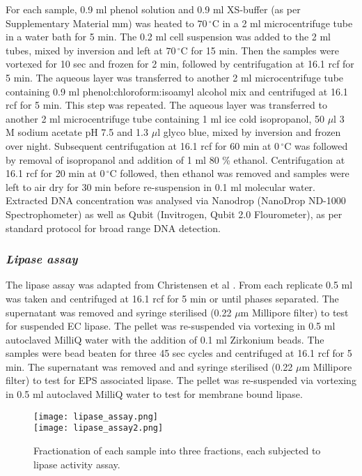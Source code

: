 \documentclass[11pt]{article}
\begin{document}
For each sample, 0.9 ml phenol solution and 0.9 ml XS-buffer (as per Supplementary Material mm) was  heated to $70\,^{\circ}\mathrm{C}$ in a 2 ml microcentrifuge tube in a water bath for 5 min. The 0.2 ml cell suspension was added to the 2 ml tubes, mixed by inversion and left at $70\,^{\circ}\mathrm{C}$ for 15 min. Then the samples were vortexed for 10 sec and frozen for 2 min, followed by centrifugation at 16.1 rcf for 5 min. The aqueous layer was transferred to another 2 ml microcentrifuge tube containing 0.9 ml phenol:chloroform:isoamyl alcohol mix and centrifuged at 16.1 rcf for 5 min. This step was repeated. The aqueous layer was transferred to another 2 ml microcentrifuge tube containing 1 ml ice cold isopropanol, 50 $\mu$l 3 M sodium acetate pH 7.5 and 1.3 $\mu$l glyco blue, mixed by inversion and frozen over night. Subsequent centrifugation at 16.1 rcf for 60 min at $0\,^{\circ}\mathrm{C}$ was followed by removal of isopropanol and addition of 1 ml 80 \% ethanol. Centrifugation at 16.1 rcf for 20 min at $0\,^{\circ}\mathrm{C}$ followed, then ethanol was removed and samples were left to air dry for 30 min before re-suspension in 0.1 ml molecular water.
\\ 
Extracted DNA concentration was analysed via Nanodrop (NanoDrop ND-1000 Spectrophometer) as well as Qubit (Invitrogen, Qubit 2.0 Flourometer), as per standard protocol for broad range DNA detection.

\subsubsection{\emph{Lipase assay}}
The lipase assay was adapted from Christensen et al \cite{christensen_03}. From each replicate 0.5 ml was taken and centrifuged at 16.1 rcf for 5 min or until phases separated. The supernatant was removed and syringe sterilised (0.22 $\mu$m Millipore filter) to test for suspended EC lipase.
The pellet was re-suspended via vortexing in 0.5 ml autoclaved MilliQ water with the addition of 0.1 ml Zirkonium beads. The samples were bead beaten for three 45 sec cycles and centrifuged at 16.1 rcf for 5 min. The supernatant was removed and and syringe sterilised (0.22 $\mu$m Millipore filter) to test for EPS associated lipase.
The pellet was re-suspended via vortexing in 0.5 ml autoclaved MilliQ water to test for membrane bound lipase.


\begin{figure}
\begin{center}
\texttt{[image: lipase\_assay.png]}\\
\texttt{[image: lipase\_assay2.png]}
\caption{Fractionation of each sample into three fractions, each subjected to lipase activity assay.}
\end{center}
\end{figure}
\end{document}
